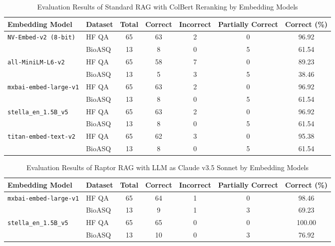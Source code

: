 \documentclass{scrartcl}
\begin{document}
\begin{table}[H]
\centering
\small
\begin{tabular}{l l c c c c c}
\hline
\textbf{Embedding Model} & \textbf{Dataset} & \textbf{Total} & \textbf{Correct} & \textbf{Incorrect} & \textbf{Partially Correct} & \textbf{Correct (\%)} \\
\hline
\multirow{2}{*}{\texttt{NV-Embed-v2 (8-bit)}} 
 & HF QA  & 65 & 63 & 2 & 0 & 96.92 \\
 & BioASQ & 13 & 8  & 0 & 5 & 61.54 \\
\hline
\multirow{2}{*}{\texttt{all-MiniLM-L6-v2}} 
 & HF QA  & 65 & 58 & 7 & 0 & 89.23 \\
 & BioASQ & 13 & 5  & 3 & 5 & 38.46 \\
\hline
\multirow{2}{*}{\texttt{mxbai-embed-large-v1}} 
 & HF QA  & 65 & 63 & 2 & 0 & 96.92 \\
 & BioASQ & 13 & 8  & 0 & 5 & 61.54 \\
\hline
\multirow{2}{*}{\texttt{stella\_en\_1.5B\_v5}} 
 & HF QA  & 65 & 63 & 2 & 0 & 96.92 \\
 & BioASQ & 13 & 8  & 0 & 5 & 61.54 \\
\hline
\multirow{2}{*}{\texttt{titan-embed-text-v2}} 
 & HF QA  & 65 & 62 & 3 & 0 & 95.38 \\
 & BioASQ & 13 & 8  & 0 & 5 & 61.54 \\
\hline
\end{tabular}
\caption{Evaluation Results of Standard RAG with ColBert Reranking by Embedding Models}
\end{table}

\begin{table}[H]
\centering
\small
\begin{tabular}{l l c c c c c}
\hline
\textbf{Embedding Model} & \textbf{Dataset} & \textbf{Total} & \textbf{Correct} & \textbf{Incorrect} & \textbf{Partially Correct} & \textbf{Correct (\%)} \\
\hline
\multirow{2}{*}{\texttt{mxbai-embed-large-v1}} 
 & HF QA  & 65 & 64 & 1 & 0 & 98.46 \\
 & BioASQ & 13 & 9  & 1 & 3 & 69.23 \\
\hline
\multirow{2}{*}{\texttt{stella\_en\_1.5B\_v5}} 
 & HF QA  & 65 & 65 & 0 & 0 & 100.00 \\
 & BioASQ & 13 & 10 & 0 & 3 & 76.92 \\
\hline
\end{tabular}
\caption{Evaluation Results of Raptor RAG with LLM as Claude v3.5 Sonnet by Embedding Models}
\label{table:raptor_eval}
\end{table}
\end{document}
